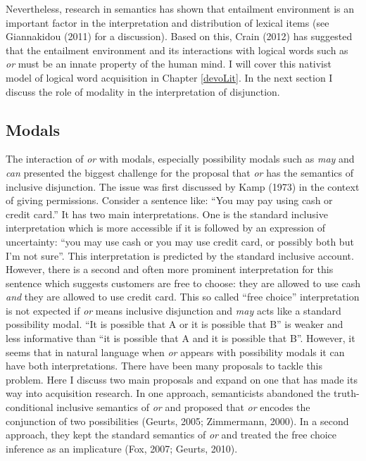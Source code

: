 \documentclass[oneside]{report}
\theoremstyle{definition}
\theoremstyle{definition}
\theoremstyle{definition}
\theoremstyle{remark}
\begin{document}
Nevertheless, research in semantics has shown that entailment
environment is an important factor in the interpretation and
distribution of lexical items (see Giannakidou (2011) for a discussion).
Based on this, Crain (2012) has suggested that the entailment
environment and its interactions with logical words such as \emph{or}
must be an innate property of the human mind. I will cover this nativist
model of logical word acquisition in Chapter \ref{devoLit}. In the next
section I discuss the role of modality in the interpretation of
disjunction.

\subsection{Modals}\label{modals}

The interaction of \emph{or} with modals, especially possibility modals
such as \emph{may} and \emph{can} presented the biggest challenge for
the proposal that \emph{or} has the semantics of inclusive disjunction.
The issue was first discussed by Kamp (1973) in the context of giving
permissions. Consider a sentence like: ``You may pay using cash or
credit card.'' It has two main interpretations. One is the standard
inclusive interpretation which is more accessible if it is followed by
an expression of uncertainty: ``you may use cash or you may use credit
card, or possibly both but I'm not sure''. This interpretation is
predicted by the standard inclusive account. However, there is a second
and often more prominent interpretation for this sentence which suggests
customers are free to choose: they are allowed to use cash \emph{and}
they are allowed to use credit card. This so called ``free choice''
interpretation is not expected if \emph{or} means inclusive disjunction
and \emph{may} acts like a standard possibility modal. ``It is possible
that A or it is possible that B'' is weaker and less informative than
``it is possible that A and it is possible that B''. However, it seems
that in natural language when \emph{or} appears with possibility modals
it can have both interpretations. There have been many proposals to
tackle this problem. Here I discuss two main proposals and expand on one
that has made its way into acquisition research. In one approach,
semanticists abandoned the truth-conditional inclusive semantics of
\emph{or} and proposed that \emph{or} encodes the conjunction of two
possibilities (Geurts, 2005; Zimmermann, 2000). In a second approach,
they kept the standard semantics of \emph{or} and treated the free
choice inference as an implicature (Fox, 2007; Geurts, 2010).
\end{document}
